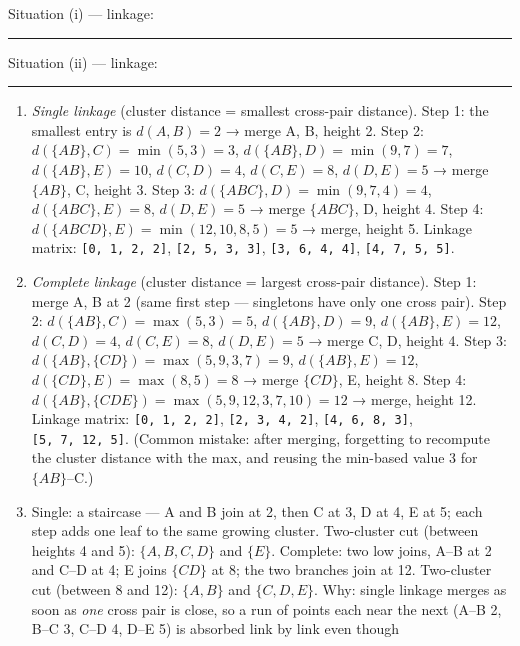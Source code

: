 \documentclass[
  11pt,
]{article}
\newcommand{\answerspace}[1]{\par\vspace*{#1}}  %
\newcommand{\blank}[1][1.2in]{\rule{#1}{0.4pt}}
\begin{document}
Situation (i) --- linkage: \blank[1.5in]

\answerspace{1in}

Situation (ii) --- linkage: \blank[1.5in]

\answerspace{1in}

\begin{solutionbox}

\begin{enumerate}
\def\labelenumi{(\alph{enumi})}
\item
  \emph{Single linkage} (cluster distance = smallest cross-pair
  distance). Step 1: the smallest entry is \(d(A,B)=2\) → merge A, B,
  height 2. Step 2: \(d(\{AB\},C)=\min(5,3)=3\),
  \(d(\{AB\},D)=\min(9,7)=7\), \(d(\{AB\},E)=10\), \(d(C,D)=4\),
  \(d(C,E)=8\), \(d(D,E)=5\) → merge \(\{AB\}\), C, height 3. Step 3:
  \(d(\{ABC\},D)=\min(9,7,4)=4\), \(d(\{ABC\},E)=8\), \(d(D,E)=5\) →
  merge \(\{ABC\}\), D, height 4. Step 4:
  \(d(\{ABCD\},E)=\min(12,10,8,5)=5\) → merge, height 5. Linkage matrix:
  \texttt{{[}0,\ 1,\ 2,\ 2{]}}, \texttt{{[}2,\ 5,\ 3,\ 3{]}},
  \texttt{{[}3,\ 6,\ 4,\ 4{]}}, \texttt{{[}4,\ 7,\ 5,\ 5{]}}.
\item
  \emph{Complete linkage} (cluster distance = largest cross-pair
  distance). Step 1: merge A, B at 2 (same first step --- singletons
  have only one cross pair). Step 2: \(d(\{AB\},C)=\max(5,3)=5\),
  \(d(\{AB\},D)=9\), \(d(\{AB\},E)=12\), \(d(C,D)=4\), \(d(C,E)=8\),
  \(d(D,E)=5\) → merge C, D, height 4. Step 3:
  \(d(\{AB\},\{CD\})=\max(5,9,3,7)=9\), \(d(\{AB\},E)=12\),
  \(d(\{CD\},E)=\max(8,5)=8\) → merge \(\{CD\}\), E, height 8. Step 4:
  \(d(\{AB\},\{CDE\})=\max(5,9,12,3,7,10)=12\) → merge, height 12.
  Linkage matrix: \texttt{{[}0,\ 1,\ 2,\ 2{]}},
  \texttt{{[}2,\ 3,\ 4,\ 2{]}}, \texttt{{[}4,\ 6,\ 8,\ 3{]}},
  \texttt{{[}5,\ 7,\ 12,\ 5{]}}. (Common mistake: after merging,
  forgetting to recompute the cluster distance with the max, and reusing
  the min-based value 3 for \(\{AB\}\)--C.)
\item
  Single: a staircase --- A and B join at 2, then C at 3, D at 4, E at
  5; each step adds one leaf to the same growing cluster. Two-cluster
  cut (between heights 4 and 5): \(\{A,B,C,D\}\) and \(\{E\}\).
  Complete: two low joins, A--B at 2 and C--D at 4; E joins \(\{CD\}\)
  at 8; the two branches join at 12. Two-cluster cut (between 8 and 12):
  \(\{A,B\}\) and \(\{C,D,E\}\). Why: single linkage merges as soon as
  \emph{one} cross pair is close, so a run of points each near the next
  (A--B 2, B--C 3, C--D 4, D--E 5) is absorbed link by link even though

\end{enumerate}
\end{solutionbox}
\end{document}
